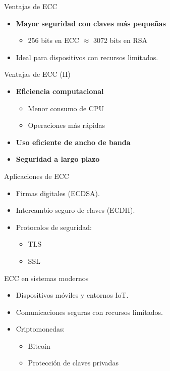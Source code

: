 \documentclass{beamer}
\begin{document}
\begin{frame}{Ventajas de ECC}
\begin{itemize}
  \item \textbf{Mayor seguridad con claves más pequeñas}
  \begin{itemize}
    \item 256 bits en ECC $\approx$ 3072 bits en RSA
  \end{itemize}
  \item Ideal para dispositivos con recursos limitados.
\end{itemize}
\end{frame}

\begin{frame}{Ventajas de ECC (II)}
\begin{itemize}
  \item \textbf{Eficiencia computacional}
  \begin{itemize}
    \item Menor consumo de CPU
    \item Operaciones más rápidas
  \end{itemize}
  \item \textbf{Uso eficiente de ancho de banda}
  \item \textbf{Seguridad a largo plazo}
\end{itemize}
\end{frame}

\begin{frame}{Aplicaciones de ECC}
\begin{itemize}
  \item Firmas digitales (ECDSA).
  \item Intercambio seguro de claves (ECDH).
  \item Protocolos de seguridad:
  \begin{itemize}
    \item TLS
    \item SSL
  \end{itemize}
\end{itemize}
\end{frame}

\begin{frame}{ECC en sistemas modernos}
\begin{itemize}
  \item Dispositivos móviles y entornos IoT.
  \item Comunicaciones seguras con recursos limitados.
  \item Criptomonedas:
  \begin{itemize}
    \item Bitcoin
    \item Protección de claves privadas
  \end{itemize}
\end{itemize}
\end{frame}
\end{document}
